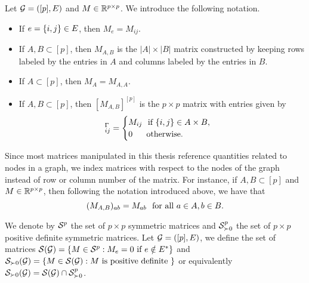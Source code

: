 Let $\G = ([p], E)$ and $M \in \R^{p \times p}$. We introduce the following notation.
\begin{itemize}
    \item If $e = \eset{i, j} \in E$, then $M_e = M_{ij}$.
    \item If $A, B \subset [p]$, then $M_{A, B}$ is the $|A| \times |B|$ matrix constructed by keeping rows labeled by the entries in $A$ and columns labeled by the entries in $B$.
    \item If $A \subset [p]$, then $M_A = M_{A, A}$.
    \item {
        If $A, B \subset [p]$, then $[M_{A, B}]^{[p]}$ is the $p \times p$ matrix with entries given by
        \begin{equation*}
            [M_{A, B}]^{\Gamma}_{ij} = \begin{cases}
                M_{ij} \ \t{ if } \eset{i, j} \in A \times B, \\
                0 \ \ \ \ \ \t{otherwise}.
            \end{cases}
        \end{equation*}
    }
\end{itemize}
Since most matrices manipulated in this thesis reference quantities related to nodes in a graph, we index matrices with respect to the nodes of the graph instead of row or column number of the matrix. For instance, if $A, B \subset [p]$ and $M \in \R^{p \times p}$, then following the notation introduced above, we have that
\begin{equation*}
    (M_{A, B})_{ab} = M_{ab} \ \ \t{for all } a \in A, b \in B.
\end{equation*}

We denote by $\S^p$ the set of $p \times p$ symmetric matrices and $\S^p_{\succ 0}$ the set of $p \times p$ positive definite symmetric matrices. Let $\G = ([p], E)$, we define the set of matrices $\S(\G) = \eset{ M \in \S^p : M_e = 0 \t{ if } e \notin E^* }$ and $\S_{\succ 0}(\G) = \eset{ M \in \S(\G) : M \t{ is positive definite } }$ or equivalently $\S_{\succ 0}(\G) = \S(\G) \cap \S^p_{\succ 0}$.